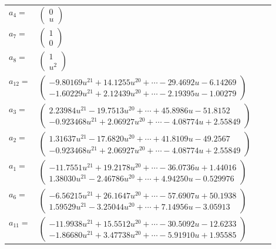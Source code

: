 \documentclass[1p]{elsarticle_modified}
\theoremstyle{definition}
\begin{document}
\begin{tabular}{m{7pt} m{180pt} m{7pt} m{180pt} }
\flushright $a_{4}=$&$\begin{pmatrix}0\\u\end{pmatrix}$ \\
\flushright $a_{7}=$&$\begin{pmatrix}1\\0\end{pmatrix}$ \\
\flushright $a_{8}=$&$\begin{pmatrix}1\\u^2\end{pmatrix}$ \\
\flushright $a_{12}=$&$\begin{pmatrix}-9.80169 u^{21}+14.1255 u^{20}+\cdots-29.4692 u-6.14269\\-1.60229 u^{21}+2.12439 u^{20}+\cdots-2.19395 u-1.00279\end{pmatrix}$ \\
\flushright $a_{3}=$&$\begin{pmatrix}2.23984 u^{21}-19.7513 u^{20}+\cdots+45.8986 u-51.8152\\-0.923468 u^{21}+2.06927 u^{20}+\cdots-4.08774 u+2.55849\end{pmatrix}$ \\
\flushright $a_{2}=$&$\begin{pmatrix}1.31637 u^{21}-17.6820 u^{20}+\cdots+41.8109 u-49.2567\\-0.923468 u^{21}+2.06927 u^{20}+\cdots-4.08774 u+2.55849\end{pmatrix}$ \\
\flushright $a_{1}=$&$\begin{pmatrix}-11.7551 u^{21}+19.2178 u^{20}+\cdots-36.0736 u+1.44016\\1.38030 u^{21}-2.46786 u^{20}+\cdots+4.94250 u-0.529976\end{pmatrix}$ \\
\flushright $a_{6}=$&$\begin{pmatrix}-6.56215 u^{21}+26.1647 u^{20}+\cdots-57.6907 u+50.1938\\1.59529 u^{21}-3.25044 u^{20}+\cdots+7.14956 u-3.05913\end{pmatrix}$ \\
\flushright $a_{11}=$&$\begin{pmatrix}-11.9938 u^{21}+15.5512 u^{20}+\cdots-30.5092 u-12.6233\\-1.86680 u^{21}+3.47738 u^{20}+\cdots-5.91910 u+1.95585\end{pmatrix}$ \\

\end{tabular}
\end{document}
